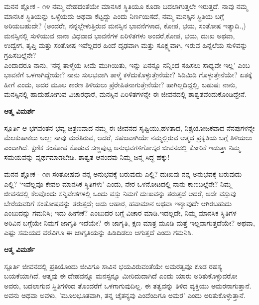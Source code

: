 \begin{mananam}{\mananamfont ಮನನ ಶ್ಲೋಕ - ೧೪}
\small \mananatext ನಮ್ಮ ದೇಹದಂತೆಯೇ ಮಾನಸಿಕ ಸ್ಥಿತಿಯೂ ಕೂಡಾ ಬದಲಾಗುತ್ತಲೇ ಇರುತ್ತದೆ. ನಾವು ನಮ್ಮ ಮಾನಸಿಕ ಸ್ಥಿತಿಯನ್ನು ಒಳ್ಳೆಯದು ಅಥವಾ ಕೆಟ್ಟದ್ದು ಎಂದು ನಿರ್ಣಯಿಸದೆ, ನಮ್ಮ ಮನಸ್ಸಿನ ಸ್ಥಿತಿಯ ಬಗ್ಗೆ ಅರಿಯಬಹುದೇ? (ಅಂದರೇ, ನನ್ನಲ್ಲೇಳುತ್ತಿರುವ ಮನಸ್ಸಿನ ಭಾವನೆಗಳಾದ, ಕೋಪ,  ಭಯ, ಸಂತೋಷ ಇತ್ಯಾದಿ.,) ಮನಸ್ಸಿನಲ್ಲಿ ಸುಳಿಯುವ ನಾನಾ ವಿಧವಾದ ಭಾವನೆಗಳ ಏರಿಳಿತಗಳು ಅಂದರೆ,ಕೋಪ, ಭಯ, ದುಃಖ ಅಥವಾ, ಉದ್ವೇಗ, ತೃಪ್ತಿ ಮತ್ತು ಸಂತೋಷ ಇವೆಲ್ಲದರ ಹಿಂದೆ ದೃಢವಾಗಿ ಮತ್ತು ಸೂಕ್ಷ್ಮವಾಗಿ, ಇರುವ ಹಿನ್ನೆಲೆಯ ಸುಳಿವನ್ನು ಗ್ರಹಿಸಬಲ್ಲೆನೇ?\\
ಎಂದಾದರೂ ನಾನು, ‘ನನ್ನ ತಾಳ್ಮೆಯ ಸೀಮೆ ಮುಗಿಯಿತು, ಇನ್ನು ಏನನ್ನೂ ನನ್ನಿಂದ ಸಹಿಸಲು ಸಾಧ್ಯವೇ ಇಲ್ಲ’ ಎಂಬ ಭಾವನೆಗೆ ಒಳಗಾಗಿದ್ದೇಯೇ? ನಾನು ಸುಲಭವಾಗಿ ತಾಳ್ಮೆ ಕಳೆದುಕೊಳ್ಳುತ್ತೇನೆಯೇ? ಸಿಡಿಮಿಡಿ ಗೊಳ್ಳುತ್ತೇನೆಯೇ? ಏತಕ್ಕೆ ಹೀಗೆ ಎಂದು, ಅದರ ಮೂಲ ಕಾರಣ ತಿಳಿಯಲು ಪ್ರೆರೇಪಿತನಾಗುತ್ತೇನೆಯೇ? ಹಾಗಿಲ್ಲದಿದ್ದಲ್ಲಿ,  ಬಹುಷಃ ನಾನು,  ಮನಸ್ಸಿನಲ್ಲಿ ಹಾದುಹೋಗುವ ವಿಚಾರಧಾರೆ, ಮನಸ್ಸಿನ ಏರಿಳಿತಗಳನ್ನೇ ಈ ಜೀವನದಲ್ಲಿ ಶಾಶ್ವತವೆಂದುಕೊಂಡಿದ್ದೇನೆ. 
\end{mananam}
\WritingHand\enspace\textbf{ಆತ್ಮ ವಿಮರ್ಶೆ}
\begin{inspiration}{\mananamfont ಸ್ಪೂರ್ತಿ}
\small \mananatext ಆ ಭಗವಂತನ ಭವ್ಯ ಚಿತ್ರಣವಾದ ನಮ್ಮ ಈ ಜೀವನದ ಸೃಷ್ಟಿಯು,ಹಳತಾದ, ನಿಶ್ಪ್ರಯೋಜಕವಾದ ನೆನಪುಗಳನ್ನೇ ಮೆಲಕುಹಾಕಲು ಅಲ್ಲ; ನಾವು ಮರೆತಿರುವ, ಆದರೆ, ಸಹಜವಾಗಿಯೇ ನಮ್ಮಲ್ಲಿರುವ ಆತ್ಮದ ಪ್ರಕೃತಿಯ ಬಗ್ಗೆ ತಿಳಿಯಲು ಎಂದಾಗಿದೆ. ಕ್ಷಣಿಕ ಸಂತೋಷ ಕೊಡುವ ಸಣ್ಣಪುಟ್ಟ ಅನುಭವಗಳಿಗೋಸ್ಕರ ಜೀವನದಲ್ಲಿ ಕೋರಿಕೆ ಇಡುತ್ತಾ ನಿಮ್ಮ ಸಮಯವನ್ನು ವ್ಯರ್ಥಮಾಡಬೇಡಿ.  ಶಾಶ್ವತ ಆನಂದವು ನಿಮ್ಮ ಜನ್ಮ ಸಿದ್ಧ ಹಕ್ಕು!
\end{inspiration}
\newpage

\begin{mananam}{\mananamfont ಮನನ ಶ್ಲೋಕ - ೧೫}
\small \mananatext ಸಂತೋಷವು ನನ್ನ ಅನುಭವಕ್ಕೆ ಬರುವುದು ಎಲ್ಲಿ?  ದುಃಖವು ನನ್ನ ಅನುಭವಕ್ಕೆ ಬರುವುದು ಎಲ್ಲಿ? ‘ಇವೆಲ್ಲವೂ ಕೇವಲ ಮಾನಸಿಕ ಸ್ಥಿತಿಗಳು’ ಎಂದು, ನೇರ ಒಳನೋಟದಲ್ಲಿ ನಾನು ಕಾಣಬಲ್ಲೆನೇ? ನಿಮ್ಮ ಜೀವನದಲ್ಲಿ ಕೆಲವೊಂದು ಸನ್ನಿವೇಶಗಳಲ್ಲಿ ಒಂದು ವಸ್ತು ನಿಮಗೆ ದುಃಖವನ್ನು ತರುತ್ತದೆ ಆದರೆ, ಅದೇ ವಸ್ತುವು ಬೇರೆಯವರಿಗೆ ಸಂತೋಷವನ್ನು ತರುತ್ತದೆ; ಅದು ಆಹಾರ, ಹವಾಮಾನ ಅಥವಾ ಇನ್ಯಾವುದೇ ಆಗಿರಬಹುದು ಎಂಬುದನ್ನು ಗಮನಿಸಿ; ಇದು ಹೀಗೇಕೆ? ಎಂಬುದರ ಬಗ್ಗೆ ವಿಚಾರ ಮಾಡಿ.ಇದಲ್ಲದೇ, ನಿಮ್ಮ ಮಾನಸಿಕ ಸ್ಥಿತಿಗಳ ಅರಿವಿನ ಬಗ್ಗೆಯೇ ನಿಮಗೆ ಜಾಗೃತಿ ಇದೆಯೇ?  ಈ ಜಾಗೃತಿ, ಕ್ಷಣ ಮಾತ್ರ ಮೂಡಿ ಮತ್ತೆ ಇಲ್ಲವಾಗುತ್ತದೆಯೇ? ಅಥವಾ, ಎಷ್ಟು ಸಮಯದ ವರೆವಿಗೂ ಈ ಜಾಗೃತಿಯನ್ನು ಹಿಡಿದಿಡಲು ಆಗುತ್ತದೆ ಎಂದು ಗಮನಿಸಿ.
\end{mananam}
\WritingHand\enspace\textbf{ಆತ್ಮ ವಿಮರ್ಶೆ}
\begin{inspiration}{\mananamfont ಸ್ಪೂರ್ತಿ}
\small \mananatext ಜೀವನದಲ್ಲಿ ಪ್ರತಿಯೊಂದು ಜೀವಿಗೂ ಸಾವಿನ ಭಯವಿರುವಂತೆಯೇ ಅಮರತ್ವವೂ ಕೂಡ ರಹಸ್ಯ ಬಯಕೆಯಾಗಿದೆ. ಆತ್ಮವು ಈ ದೇಹವನ್ನೂ ಮನಸ್ಸನ್ನೂ ಮೀರಿದುದಾಗಿದೆ ಎಂದು ಯಾರು ಅರಿತುಕೊಳ್ಳುವರೋ ಅವರು, ಬದಲಾಗುವ ಸ್ಥಿತಿಗಳಿಂದ ತೊಂದರೆಗೆ ಒಳಗಾಗುವುದಿಲ್ಲ. ಈ ತತ್ವವನ್ನು ತಿಳಿದ ವ್ಯಕ್ತಿಯು ಅಮರನಾಗುತ್ತಾನೆ. ಅವನು ಅಥವಾ ಅವಳು, 'ಮೂಲಭೂತವಾಗಿ, ತನ್ನ ಚೈತನ್ಯವು ಎಂದೆಂದಿಗೂ ಅಮರ' ಎಂದು ಅರಿತುಕೊಳ್ಳುತ್ತಾನೆ.
\end{inspiration}

